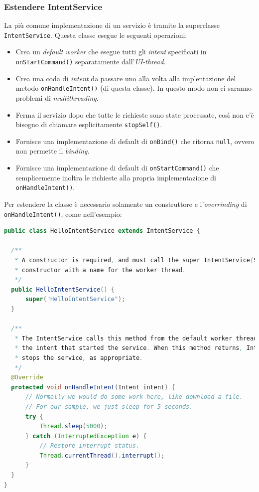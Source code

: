\subsubsection{Estendere IntentService}
La più comune implementazione di un servizio è tramite la superclasse \texttt{IntentService}.
Questa classe esegue le seguenti operazioni:
\begin{itemize}
	\item Crea un \textit{default worker} che esegue tutti gli \textit{intent} specificati in \texttt{onStartCommand()} separatamente dall'\textit{UI-thread}.
	\item Crea una coda di \textit{intent} da passare uno alla volta alla implentazione del metodo \texttt{onHandleIntent()} (di questa classe). In questo modo non ci saranno problemi di \textit{multithreading}.
	\item Ferma il servizio dopo che tutte le richieste sono state processate, così non c'è bisogno di chiamare esplicitamente \texttt{stopSelf()}.
	\item Fornisce una implementazione di default di \texttt{onBind()} che ritorna \texttt{null}, ovvero non permette il \textit{binding}.
	\item Fornisce una implementazione di default di \texttt{onStartCommand()} che semplicemente inoltra le richieste alla propria implementazione di \texttt{onHandleIntent()}.
\end{itemize}

Per estendere la classe è necessario solamente un construttore e l'\textit{overrinding} di \texttt{onHandleIntent()}, come nell'esempio:

\begin{lstlisting}[language=Java]
public class HelloIntentService extends IntentService {

  /**
   * A constructor is required, and must call the super IntentService(String)
   * constructor with a name for the worker thread.
   */
  public HelloIntentService() {
      super("HelloIntentService");
  }

  /**
   * The IntentService calls this method from the default worker thread with
   * the intent that started the service. When this method returns, IntentService
   * stops the service, as appropriate.
   */
  @Override
  protected void onHandleIntent(Intent intent) {
      // Normally we would do some work here, like download a file.
      // For our sample, we just sleep for 5 seconds.
      try {
          Thread.sleep(5000);
      } catch (InterruptedException e) {
          // Restore interrupt status.
          Thread.currentThread().interrupt();
      }
  }
}
\end{lstlisting}

